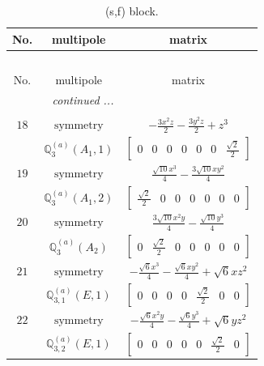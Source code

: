 \documentclass[fleqn,8pt,landscape]{jsarticle}
\begin{document}
\begin{longtable}{ccc}
\caption{(s,f) block.}
 \\
 \hline \hline
No. & multipole & matrix \\ \hline \endfirsthead

\multicolumn{2}{l}{\tablename\ \thetable{}} \\
 \hline \hline
No. & multipole & matrix \\ \hline \endhead

 \hline \hline
\multicolumn{2}{r}{\footnotesize\it continued ...} \\ \endfoot

 \hline \hline
\multicolumn{2}{r}{} \\ \endlastfoot

$ 18 $ & $ \text{symmetry} $ & $ - \frac{3 x^{2} z}{2} - \frac{3 y^{2} z}{2} + z^{3} $ \\
$  $ & $ \mathbb{Q}_{3}^{(a)}(A_{1},1) $ & $ \begin{bmatrix} 0 & 0 & 0 & 0 & 0 & 0 & \frac{\sqrt{2}}{2} \end{bmatrix} $ \\ \hline
$ 19 $ & $ \text{symmetry} $ & $ \frac{\sqrt{10} x^{3}}{4} - \frac{3 \sqrt{10} x y^{2}}{4} $ \\
$  $ & $ \mathbb{Q}_{3}^{(a)}(A_{1},2) $ & $ \begin{bmatrix} \frac{\sqrt{2}}{2} & 0 & 0 & 0 & 0 & 0 & 0 \end{bmatrix} $ \\ \hline
$ 20 $ & $ \text{symmetry} $ & $ \frac{3 \sqrt{10} x^{2} y}{4} - \frac{\sqrt{10} y^{3}}{4} $ \\
$  $ & $ \mathbb{Q}_{3}^{(a)}(A_{2}) $ & $ \begin{bmatrix} 0 & \frac{\sqrt{2}}{2} & 0 & 0 & 0 & 0 & 0 \end{bmatrix} $ \\ \hline
$ 21 $ & $ \text{symmetry} $ & $ - \frac{\sqrt{6} x^{3}}{4} - \frac{\sqrt{6} x y^{2}}{4} + \sqrt{6} x z^{2} $ \\
$  $ & $ \mathbb{Q}_{3,1}^{(a)}(E,1) $ & $ \begin{bmatrix} 0 & 0 & 0 & 0 & \frac{\sqrt{2}}{2} & 0 & 0 \end{bmatrix} $ \\ \hline
$ 22 $ & $ \text{symmetry} $ & $ - \frac{\sqrt{6} x^{2} y}{4} - \frac{\sqrt{6} y^{3}}{4} + \sqrt{6} y z^{2} $ \\
$  $ & $ \mathbb{Q}_{3,2}^{(a)}(E,1) $ & $ \begin{bmatrix} 0 & 0 & 0 & 0 & 0 & \frac{\sqrt{2}}{2} & 0 \end{bmatrix} $ \\ \hline

\end{longtable}
\end{document}
